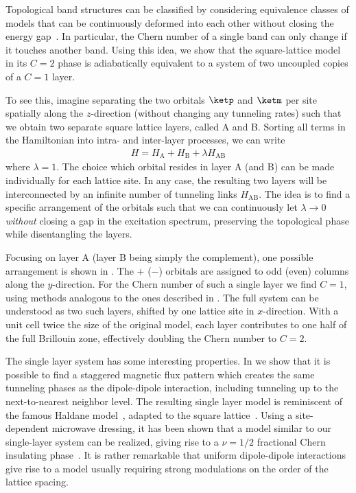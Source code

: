 Topological band structures can be classified by considering equivalence classes of models that can be continuously deformed into each other without closing the energy gap~\cite{Hasan2010}.
In particular, the Chern number of a single band can only change if it touches another band.
Using this idea, we show that the square-lattice model in its $C=2$ phase is adiabatically equivalent to a system of two uncoupled copies of a $C=1$ layer.

To see this, imagine separating the two orbitals $\ketp$ and $\ketm$ per site spatially along the $z$-direction (without changing any tunneling rates) such that we obtain two separate square lattice layers, called A and B.
Sorting all terms in the Hamiltonian into intra- and inter-layer processes, we can write
\begin{align}
H=H_\text{A} + H_\text{B} + \lambda H_\text{AB}
\end{align}
where $\lambda=1$.
The choice which orbital resides in layer A (and B) can be made individually for each lattice site.
In any case, the resulting two layers will be interconnected by an infinite number of tunneling links $H_\text{AB}$.
The idea is to find a specific arrangement of the orbitals such that we can continuously let $\lambda \longrightarrow 0$ \emph{without} closing a gap in the excitation spectrum, preserving the topological phase while disentangling the layers.

Focusing on layer A (layer B being simply the complement), one possible arrangement is shown in .
The ${+}$ (${-}$) orbitals are assigned to odd (even) columns along the $y$-direction.
For the Chern number of such a single layer we find $C=1$, using methods analogous to the ones described in .
The full system can be understood as two such layers, shifted by one lattice site in $x$-direction.
With a unit cell twice the size of the original model, each layer contributes to one half of the full Brillouin zone, effectively doubling the Chern number to $C=2$.

The single layer system has some interesting properties.
In  we show that it is possible to find a staggered magnetic flux pattern which creates the same tunneling phases as the dipole-dipole interaction, including tunneling up to the next-to-nearest neighbor level.
The resulting single layer model is reminiscent of the famous Haldane model~\cite{Haldane1988}, adapted to the square lattice~\cite{Goldman2013,Li2008,Liu2010,Liu2011,Stanescu2010,Wang2011,Wang2014,Yao2012,Yao2013}.
Using a site-dependent microwave dressing, it has been shown that a model similar to our single-layer system can be realized, giving rise to a $\nu=1/2$ fractional Chern insulating phase~\cite{Yao2012,Yao2013}.
It is rather remarkable that uniform dipole-dipole interactions give rise to a model usually requiring strong modulations on the order of the lattice spacing.

